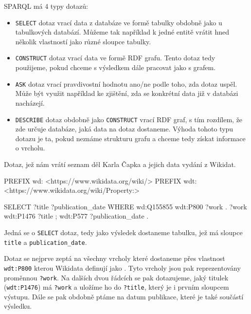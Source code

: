 SPARQL má 4 typy dotazů:
\begin{itemize}
    \item \texttt{SELECT} dotaz vrací data z databáze ve formě tabulky obdobně jako u tabulkových databází. Můžeme tak například k jedné entitě vrátit hned několik vlastností jako různé sloupce tabulky.
    \item \texttt{CONSTRUCT} dotaz vrací data ve formě RDF grafu. Tento dotaz tedy použijeme, pokud chceme s výsledkem dále pracovat jako s grafem.
    \item \texttt{ASK} dotaz vrací pravdivostní hodnotu ano/ne podle toho, zda dotaz uspěl. Může být využit například ke zjištění, zda se konkrétní data již v databázi nacházejí.
    \item \texttt{DESCRIBE} dotaz obdobně jako \texttt{CONSTRUCT} vrací RDF graf, s tím rozdílem, že zde určuje databáze, jaká data na dotaz dostaneme. Výhoda tohoto typu dotazu je ta, pokud neznáme strukturu grafu a chceme tedy získat  informace o vrcholu.
\end{itemize}

\newpage

\begin{prikl}
Dotaz, jež nám vrátí seznam děl Karla Čapka a jejich data vydání z Wikidat.
\begin{code}
PREFIX wd: <https://www.wikidata.org/wiki/>
PREFIX wdt: <https://www.wikidata.org/wiki/Property:>

SELECT ?title ?publication_date
WHERE
{
    wd:Q155855 wdt:P800 ?work .
    ?work wdt:P1476 ?title ;
          wdt:P577 ?publication_date .
}
\end{code}
Jedná se o \texttt{SELECT} dotaz, tedy jako výsledek dostaneme tabulku, jež má sloupce \texttt{title} a \texttt{publication_date}.

Dotaz se nejprve zeptá na všechny vrcholy které dostaneme přes vlastnost \texttt{wdt:P800} kterou Wikidata definují jako . Tyto vrcholy jsou pak reprezentovány proměnnou \texttt{?work}. Na dalších dvou řádcích se pak dotazujeme, jaký titulek (\texttt{wdt:P1476}) má \texttt{?work} a uložíme ho do \texttt{?title}, který je i prvním sloupcem výstupu. Dále se pak obdobně ptáme na datum publikace, které je také součástí výsledku.
\end{prikl}